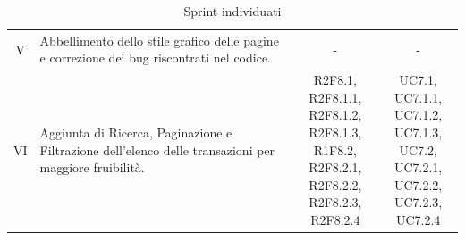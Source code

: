 \begin{table}[H]
\begin{tabular}{c|p{6cm}|c|c}
    V   & Abbellimento dello stile grafico delle pagine e correzione dei bug riscontrati nel codice.                                                                                            & -                                  & - \\
    VI  & Aggiunta di Ricerca, Paginazione e Filtrazione dell'elenco delle transazioni per maggiore fruibilità.                                                                                 & \Shortunderstack{R2F8.1, R2F8.1.1,     \\R2F8.1.2, R2F8.1.3,\\R1F8.2, R2F8.2.1,\\R2F8.2.2, R2F8.2.3,\\R2F8.2.4\\} & \Shortunderstack{UC7.1, UC7.1.1,\\UC7.1.2, UC7.1.3,\\UC7.2, UC7.2.1,\\UC7.2.2, UC7.2.3,\\UC7.2.4\\} \\
  \end{tabular}
  \caption{Sprint individuati}
\end{table}
\pagebreak